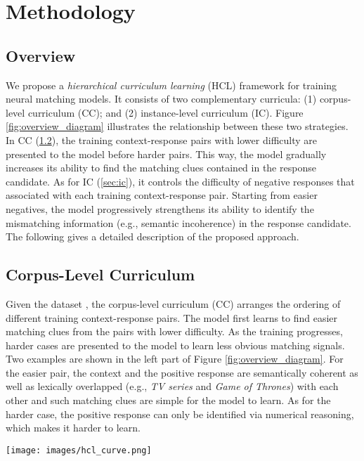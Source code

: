 \documentclass[11pt,a4paper]{article}
\begin{document}
\section{Methodology}
\subsection{Overview}
We propose a \textit{hierarchical curriculum learning} (HCL) framework for training neural matching models. It consists of two complementary curricula: (1) corpus-level curriculum (CC); and (2) instance-level curriculum (IC). Figure \ref{fig:overview_diagram} illustrates the relationship between these two strategies. In CC (\cref{sec:cc}), the training context-response pairs with lower difficulty are presented to the model before harder pairs. This way, the model gradually increases its ability to find the matching clues contained in the response candidate.
As for IC (\cref{sec:ic}), it controls the difficulty
of negative responses that associated with each training context-response pair. Starting from easier negatives, the model progressively strengthens its ability to identify the mismatching information (e.g., semantic incoherence) in the response candidate. 
The following gives a detailed description of the proposed approach. 


\subsection{Corpus-Level Curriculum}
\label{sec:cc}
Given the dataset , the corpus-level curriculum (CC) arranges the ordering of different training context-response pairs. The model first learns to find easier matching clues from the pairs with lower difficulty. As the training progresses, harder cases are presented to the model to learn less obvious matching signals. Two examples are shown in the left part of Figure \ref{fig:overview_diagram}. For the easier pair, the context and the positive response are semantically coherent as well as lexically overlapped (e.g., \textit{TV series} and \textit{Game of Thrones}) with each other and such matching clues are simple for the model to learn. As for the harder case, the positive response can only be identified via numerical reasoning, which makes it harder to learn.


\begin{figure*}[t] 
	\centering    
	\setlength{\abovecaptionskip}{3pt}
\texttt{[image: images/hcl\_curve.png]}
	\caption{(a) Illustration of the corpus-level curriculum. At each step: (1)  is computed based on the current step ; and (2) a batch of context-response pairs are uniformly sampled from the training instances whose corpus-level difficulty is lower than  (shaded area in the example). In this example,  and ; (b) Illustration of the instance-level pacing function. In this example, , , and .}
\label{fig:cc}
\end{figure*}
\end{document}
